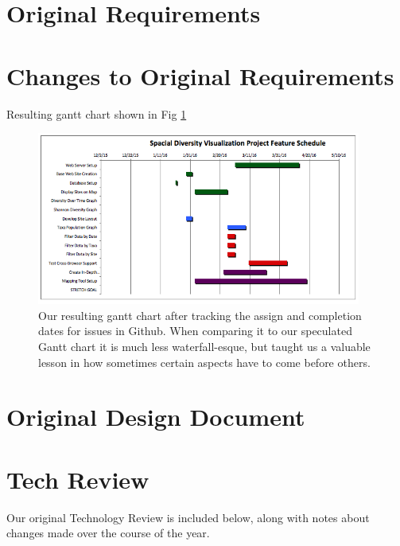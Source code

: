 \documentclass[10pt,draftclsnofoot,onecolumn]{IEEEtran}
\begin{document}
\newpage
\section{Original Requirements} %


\newpage
\section{Changes to Original Requirements} %
Resulting gantt chart shown in Fig \ref{fig:final_gantt}
\begin{figure}[h]
\centering
\includegraphics[width=0.95\textwidth]{FinalGantt.png}
\captionsetup{justification=centering}
\caption{
  Our resulting gantt chart after tracking the assign and completion dates for issues in Github.
  When comparing it to our speculated Gantt chart it is much less waterfall-esque, but taught us a valuable lesson in how sometimes certain aspects have to come before others.
}
\label{fig:final_gantt}
\end{figure}

\newpage
\section{Original Design Document} %

\newpage
\section{Tech Review} %
Our original Technology Review is included below, along with notes about changes made over the course of the year.

\end{document}
